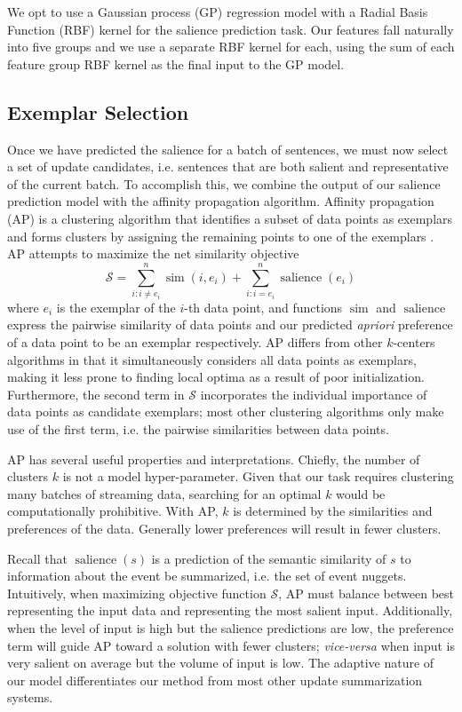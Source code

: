 We opt to use a Gaussian process (GP) regression model
\cite{rasmussen:gaussian-process-book} with a Radial Basis Function (RBF) 
kernel for the salience prediction task. Our features fall naturally into 
five groups and we use a separate RBF kernel for each, using the sum of each 
feature group RBF kernel as the final input to the GP model.


\subsection{Exemplar Selection}
\label{sec:exsel}


Once we have predicted the salience for a batch of sentences, we must
now select a set of update candidates, i.e. sentences that are both salient
and representative of the current batch. To accomplish this, we combine the 
output of our salience prediction model with the affinity propagation 
algorithm.
Affinity propagation (AP) is a clustering algorithm
that identifies a subset of data points as exemplars and forms clusters
by assigning the remaining points to one of the exemplars 
\cite{frey2007clustering}. AP attempts to maximize the net similarity 
objective 
\[ \mathcal{S} = \sum_{i : i \neq e_i}^n \operatorname{sim}(i,e_i) 
+ \sum_{i : i = e_i}^n \operatorname{salience}(e_i)  \]
where $e_i$ is the exemplar of the $i$-th data point, and functions
$\operatorname{sim}$ and $\operatorname{salience}$ express the pairwise 
similarity of data points and our predicted \textit{apriori} preference of a 
data point to be an exemplar respectively. 
AP differs from other $k$-centers algorithms in that it simultaneously 
considers all data points as exemplars, making it less prone to finding local 
optima as a result of poor initialization. Furthermore, the second term in 
$\mathcal{S}$ incorporates the individual importance of data points as 
candidate exemplars; most other clustering algorithms only make use of the 
first term, i.e. the pairwise similarities between data points.
 

AP has several useful properties and interpretations. Chiefly, the number
of clusters $k$ is not a model hyper-parameter. Given that our task requires
clustering many batches of streaming data, searching for an optimal $k$ 
would be computationally prohibitive. With AP, $k$ is determined by the
similarities and preferences of the data. Generally lower preferences will
result in fewer clusters.  


Recall that $\operatorname{salience}(s)$ is a prediction of the semantic 
similarity of $s$ to information about the event be summarized, i.e. the set 
of event nuggets. Intuitively, when maximizing objective function 
$\mathcal{S}$, AP must balance between best representing the input data and 
representing the most salient input. Additionally, when the level of input is 
high but the salience predictions are low, the preference term will guide AP 
toward a solution with fewer clusters; \textit{vice-versa} when input is very 
salient on average but the volume of input is low. The adaptive nature of our 
model differentiates our method from most other update summarization systems.


